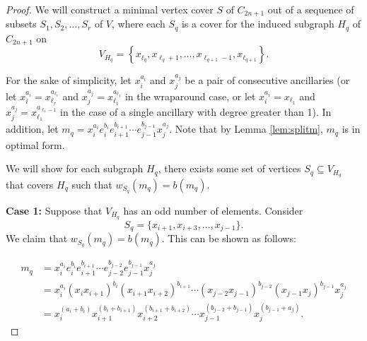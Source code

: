 \documentclass[12pt]{amsart}
\def\set#1{\left\{ {#1} \right\}}
\theoremstyle{plain}
\theoremstyle{definition}
\begin{document}
\begin{proof}

We will construct a minimal vertex cover $S$ of $C_{2n+1}$ out of a sequence of subsets $S_{1}, S_{2},\ldots, S_{r}$ of $V$, where each $S_q$ is a cover for the induced subgraph $H_q$ of $C_{2n+1}$ on $$V_{H_q} = \set{x_{\ell_q},x_{\ell_{q}+1}, \ldots, x_{\ell_{q+1}-1}, x_{\ell_{q+1}}}.$$

For the sake of simplicity, let $x_i^{a_i}$ and $x_j^{a_j}$ be a pair of consecutive ancillaries (or let $x_i^{a_i}=x_{\ell_r}^{a_{\ell_r}}$ and $x_j^{a_j}=x_{\ell_1}^{a_{\ell_1}}$ in the wraparound case, or let $x_i^{a_i} = x_{\ell_1}$ and $x_j^{a_j} = x_{\ell_1}^{a_{\ell_1-1}}$ in the case of a single ancillary with degree greater than 1).
In addition, let $m_q = x_i^{a_i} e_{i}^{b_i} e_{i+1}^{b_{i+1}} \cdots e_{j-1}^{b_{j-1}} x_{j}^{a_{j}}$. Note that by Lemma \ref{lem:splitm}, $m_q$ is in optimal form.

We will show for each subgraph ${H_q}$, there exists some set of vertices $S_q \subseteq V_{H_q}$ that covers ${H_q}$ such that $w_{S_q}(m_q) = b(m_q)$.

\textbf{Case 1:} Suppose that $V_{H_q}$ has an odd number of elements. Consider $$S_q = \{x_{i+1}, x_{i+3},\ldots,x_{j-1}\}.$$ We claim that $w_{S_q}(m_q) = b(m_q)$.  This can be shown as follows:

\begin{align*}
m_q &= x_i^{a_i} e_{i}^{b_i} e_{i+1}^{b_{i+1}} \cdots e_{j-2}^{b_{j-2}}e_{j-1}^{b_{j-1}} x_{j}^{a_{j}}\\
&= x_i^{a_i} (x_{i} x_{i+1})^{b_i} (x_{i+1} x_{i+2})^{b_{i+1}} \cdots (x_{j-2}x_{j-1})^{b_{j-2}}(x_{j-1} x_j)^{b_{j-1}} x_{j}^{a_{j}}\\
&= x_i^{(a_i + b_i)} x_{i+1}^{(b_{i} + b_{i+1})} x_{i+2}^{(b_{i+1} + b_{i+2})} \cdots x_{j-1}^{(b_{j-2} + b_{j-1})} x_{j}^{(b_{j-1} + a_{j})}.
\end{align*}



\end{proof}
\end{document}
